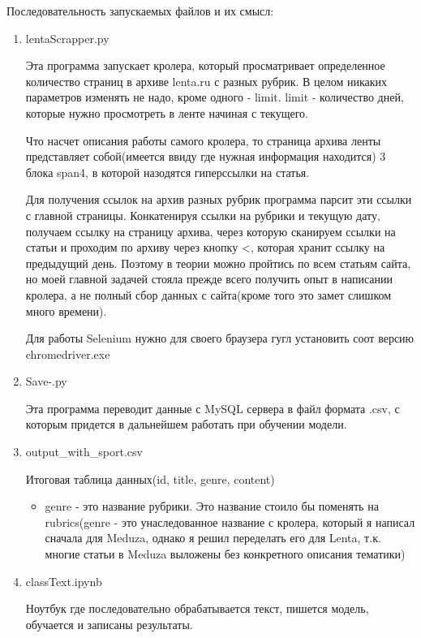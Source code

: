 Последовательность запускаемых файлов и их смысл:
\begin{enumerate}
    \item lentaScrapper.py
    
    Эта программа запускает кролера, который просматривает определенное количество страниц в архиве lenta.ru с разных рубрик. В целом никаких параметров изменять не надо, кроме одного - limit. limit - количество дней, которые нужно просмотреть в ленте начиная с текущего.
    
    Что насчет описания работы самого кролера, то страница архива ленты представляет собой(имеется ввиду где нужная информация находится) 3 блока span4, в которой назодятся гиперссылки на статья. 
    
    Для получения ссылок на архив разных рубрик программа парсит эти ссылки с главной страницы. Конкатенируя ссылки на рубрики и текущую дату, получаем ссылку на страницу архива, через которую сканируем ссылки на статьи и проходим по архиву через кнопку <, которая хранит ссылку на предыдущий день. Поэтому в теории можно пройтись по всем статьям сайта, но моей главной задачей стояла прежде всего получить опыт в написании кролера, а не полный сбор данных с сайта(кроме того это замет слишком много времени).
    
    Для работы Selenium нужно для своего браузера гугл установить соот версию chromedriver.exe
    
    \item Save-.py
    
    Эта программа переводит данные с MySQL сервера в файл формата .csv, с которым придется в дальнейшем работать при обучении модели.
    
    \item output\_with\_sport.csv
    
    Итоговая таблица данных(id, title, genre, content)
    \begin{itemize}
        \item genre - это название рубрики. Это название стоило бы поменять на rubrics(genre - это унаследованное название с кролера, который я написал сначала для Meduza, однако я решил переделать его для Lenta, т.к. многие статьи в Meduza выложены без конкретного описания тематики)
    \end{itemize}
    
    \item classText.ipynb
    
    Ноутбук где последовательно обрабатывается текст, пишется модель, обучается и записаны результаты.
    
\end{enumerate}


